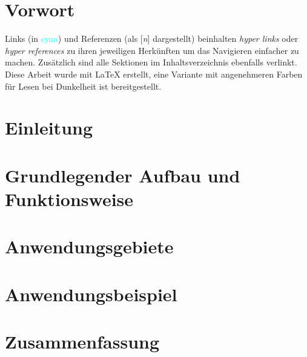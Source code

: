 \documentclass{article}
\begin{document}
    

    \tableofcontents
    \thispagestyle{empty}
    \newpage


    \section{Vorwort}
        Links (in \textcolor{cyan}{cyan}) und Referenzen (als [\textit{n}]
        dargestellt) beinhalten \textit{hyper links} oder \textit{hyper references}
        zu ihren jeweiligen Herkünften um das Navigieren einfacher zu machen.
        Zusätzlich sind alle Sektionen im Inhaltsverzeichnis ebenfalls verlinkt.
        Diese Arbeit wurde mit \LaTeX{} erstellt, eine Variante mit angenehmeren
        Farben für Lesen bei Dunkelheit ist bereitgestellt.

    \section{Einleitung}
    

    \section{Grundlegender Aufbau und Funktionsweise}
    

    \section{Anwendungsgebiete}
    

    \section{Anwendungsbeispiel}
    

    \section{Zusammenfassung}

    
\end{document}
